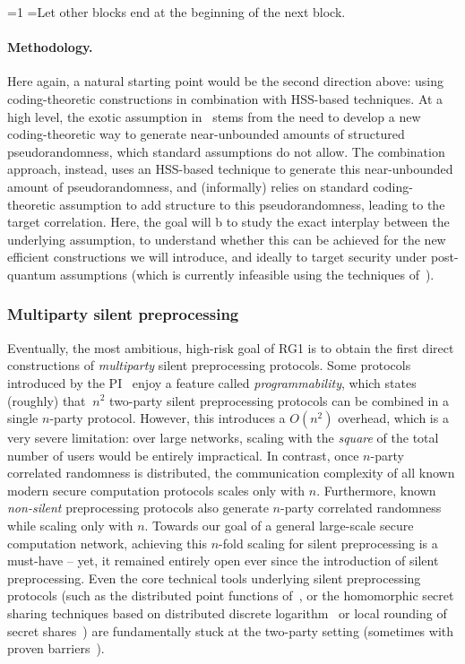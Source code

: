 \documentclass[oneside, a4paper, onecolumn, 11pt]{article}
\newcounter{alphasect}
\def\alphainsection{0}
\newenvironment{alphasection}{%
  \ifnum\alphainsection=1%
    \errhelp={Let other blocks end at the beginning of the next block.}
    \errmessage{Nested Alpha section not allowed}
  \fi%
  \setcounter{alphasect}{0}
  \def\alphainsection{1}
}{%
  \setcounter{alphasect}{0}
  \def\alphainsection{0}
}%
\begin{document}
\begin{alphasection}
\paragraph{Methodology.} Here again, a natural starting point would be the second direction above: using coding-theoretic constructions in combination with HSS-based techniques. At a high level, the exotic assumption in~\cite{FOCS:BCGIKS20,C:BCGIKRS22} stems from the need to develop a new coding-theoretic way to generate near-unbounded amounts of structured pseudorandomness, which standard assumptions do not allow. The combination approach, instead, uses an HSS-based technique to generate this near-unbounded amount of pseudorandomness, and (informally) relies on standard coding-theoretic assumption to add structure to this pseudorandomness, leading to the target correlation. Here, the goal will b to study the exact interplay between the underlying assumption, to understand whether this can be achieved for the new efficient constructions we will introduce, and ideally to target security under post-quantum assumptions (which is currently infeasible using the techniques of~\cite{EC:OrlSchYak21}).

\subsubsection{Multiparty silent preprocessing}
\label{subsub:msp}

Eventually, the most ambitious, high-risk goal of RG1 is to obtain the first direct constructions of \emph{multiparty} silent preprocessing protocols. Some protocols introduced by the PI~\cite{C:BCGIKS20,C:BCGIKRS22} enjoy a feature called \emph{programmability}, which states (roughly) that $~n^2$ two-party silent preprocessing protocols can be combined in a single $n$-party protocol. However, this introduces a $O(n^2)$ overhead, which is a very severe limitation: over large networks, scaling with the \emph{square} of the total number of users would be entirely impractical. In contrast, once $n$-party correlated randomness is distributed, the communication complexity of all known modern secure computation protocols scales only with $n$. Furthermore, known \emph{non-silent} preprocessing protocols also generate $n$-party correlated randomness while scaling only with $n$. Towards our goal of a general large-scale secure computation network, achieving this $n$-fold scaling for silent preprocessing is a must-have -- yet, it remained entirely open ever since the introduction of silent preprocessing. Even the core technical tools underlying silent preprocessing protocols (such as the distributed point functions of~\cite{EC:GilIsh14}, or the homomorphic secret sharing techniques based on distributed discrete logarithm~\cite{C:BoyGilIsh16} or local rounding of secret shares~\cite{EC:BoyKohSch19}) are fundamentally stuck at the two-party setting (sometimes with proven barriers~\cite{C:BDIR18}).


\end{alphasection}
\end{document}

